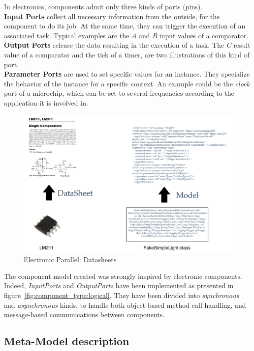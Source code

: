In electronics, components admit only three kinds of ports (pins).\\
{\bf Input Ports} collect all necessary information from the outside, for the component to do its job. At the same time, they can trigger the execution of an associated task. Typical examples are the \textit{A} and \textit{B} input values of a comparator.\\
{\bf Output Ports} release the data resulting in the execution of a task. The \textit{C} result value of a comparator and the tick of a timer, are two illustrations of this kind of port.\\
{\bf Parameter Ports} are used to set specific values for an instance. They specialize the behavior of the instance for a specific context. An example could be the \textit{clock} port of a microchip, which can be set to several frequencies according to the application it is involved in.\\

\begin{figure}
\centering
	\includegraphics[width=.9\textwidth]{part2/pics/DataSheet.pdf}
	\caption{Electronic Parallel: Datasheets}
 	\label{fig:elecDataSheet}
\end{figure}

The component model created was strongly inspired by electronic components. Indeed, {\it InputPorts} and {\it OutputPorts} have been implemented as presented in figure~\ref{fig:component_type:logical}. They have been divided into \textit{synchronous} and \textit{asynchronous} kinds, to handle both object-based method call handling, and message-based communications between components.\\

\subsection{Meta-Model description}
 
